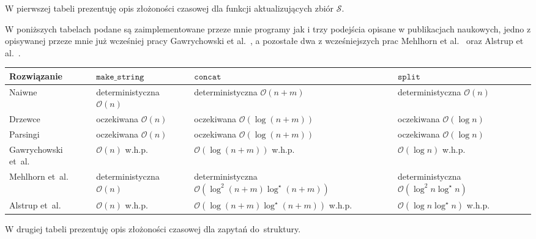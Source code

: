 \documentclass[declaration,shortabstract]{iithesis}
\theoremstyle{definition} \newtheorem{definition}{Definicja}[chapter]
\theoremstyle{plain} \newtheorem{remark}[definition]{Obserwacja}
\theoremstyle{plain} \newtheorem{theorem}[definition]{Twierdzenie}
\theoremstyle{plain} \newtheorem{example}{Przykład}[definition]
\theoremstyle{plain} \newtheorem{lemma}[definition]{Lemat}
\begin{document}
W pierwszej tabeli prezentuję opis złożoności czasowej dla funkcji aktualizujących zbiór $\mathcal{S}$. 

W poniższych tabelach podane są zaimplementowane przeze mnie programy jak i trzy podejścia opisane w publikacjach naukowych, jedno z opisywanej przeze mnie już wcześniej pracy Gawrychowski et al.~\cite{gawrychowski}, a pozostałe dwa z wcześniejszych prac Mehlhorn et al.~\cite{mehlhorn} oraz Alstrup et al.~\cite{alstrup}.

\begin{center}
    \begin{tabular}{ | m{2.3cm} | >{\centering\arraybackslash}m{2.8cm} | >{\centering\arraybackslash}m{4.5cm} | >{\centering\arraybackslash}m{2.8cm} | }
        \hline 
        Rozwiązanie & $\texttt{make\_string}$ & $\texttt{concat}$ & $\texttt{split}$ \\
        \hline
        Naiwne & deterministyczna $\mathcal{O}(n)$ & deterministyczna $\mathcal{O}(n + m)$ & deterministyczna $\mathcal{O}(n)$ \\
        \hline
        Drzewce & oczekiwana $\mathcal{O}(n)$ & oczekiwana $\mathcal{O}(\log(n + m))$ & oczekiwana $\mathcal{O}(\log n)$ \\
        \hline
        Parsingi & oczekiwana $\mathcal{O}(n)$ & oczekiwana $\mathcal{O}(\log(n + m))$ & oczekiwana $\mathcal{O}(\log n)$ \\
        \hline
        Gawrychowski et~al.~\cite{gawrychowski} & $\mathcal{O}(n)$ w.h.p. & $\mathcal{O}(\log(n + m))$ w.h.p. & $\mathcal{O}(\log n)$ w.h.p. \\
        \hline
        Mehlhorn et~al.~\cite{mehlhorn} & deterministyczna $\mathcal{O}(n)$ & deterministyczna $\mathcal{O}(\log^2(n + m)\log^\star(n + m))$ & deterministyczna $\mathcal{O}(\log^2 n \log^\star n)$ \\
        \hline
        Alstrup et~al.~\cite{alstrup} & $\mathcal{O}(n)$ w.h.p. & $\mathcal{O}(\log(n + m)\log^\star(n + m))$ w.h.p. & $\mathcal{O}(\log n \log^\star n)$ w.h.p.\\
        \hline
    \end{tabular}
\end{center}

W drugiej tabeli prezentuję opis złożoności czasowej dla zapytań do~struktury.
\end{document}
